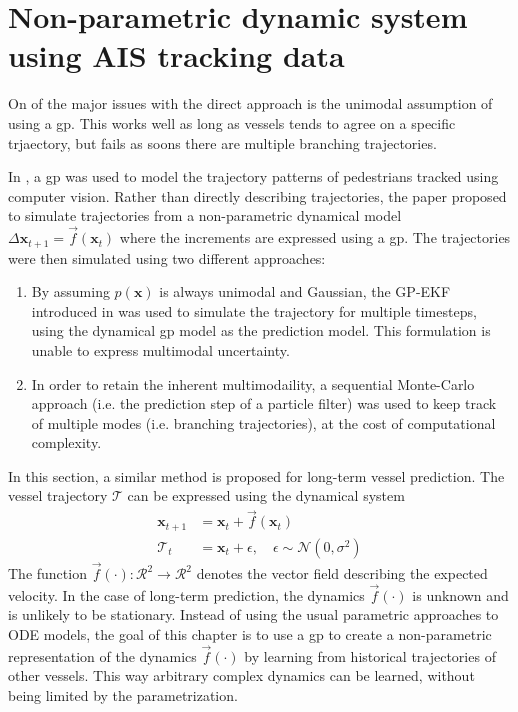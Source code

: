 \chapter{Non-parametric dynamic system using AIS tracking data}
On of the major issues with the direct approach is the unimodal assumption of using a \acrshort{gp}. This works well as long as vessels tends to agree on a specific trjaectory, but fails as soons there are multiple branching trajectories.

In \cite{pedestrian}, a \acrshort{gp} was used to model the trajectory patterns of pedestrians tracked using computer vision. Rather than directly describing trajectories, the paper proposed to simulate trajectories from a non-parametric dynamical model $\Delta\boldsymbol{x}_{t+1} = \vec{f}(\boldsymbol{x}_t)$ where the increments are expressed using a \acrshort{gp}. The trajectories were then simulated using two different approaches: 
\begin{enumerate}
    \item By assuming $p(\boldsymbol{x})$ is always unimodal and Gaussian, the GP-EKF introduced in \cite{gpekf} was used to simulate the trajectory for multiple timesteps, using the dynamical \acrshort{gp} model as the prediction model. This formulation is unable to express multimodal uncertainty.
    \item In order to retain the inherent multimodaility, a sequential Monte-Carlo approach (i.e. the prediction step of a particle filter) was used to keep track of multiple modes (i.e. branching trajectories), at the cost of computational complexity. 
\end{enumerate}

In this section, a similar method is proposed for long-term vessel prediction. The vessel trajectory $\boldsymbol{\mathcal{T}}$ can be expressed using the dynamical system
\begin{subequations}
\begin{align}
    \boldsymbol{x}_{t+1} &= \boldsymbol{x}_t + \vec{f}(\boldsymbol{x}_t)\\
    \mathcal{T}_t &= \boldsymbol{x}_t + \epsilon, \quad \epsilon \sim \mathcal{N}(0, \sigma^2)
\end{align}
\end{subequations}
The function $\vec{f}(\cdot): \mathcal{R}^2 \to \mathcal{R}^2$ denotes the vector field describing the expected velocity. In the case of long-term prediction, the dynamics $\vec{f}(\cdot)$ is unknown and is unlikely to be stationary. Instead of using the usual parametric approaches to ODE models, the goal of this chapter is to use a \acrshort{gp} to create a non-parametric representation of the dynamics $\vec{f}(\cdot)$ by learning from historical trajectories of other vessels. This way arbitrary complex dynamics can be learned, without being limited by the parametrization.


